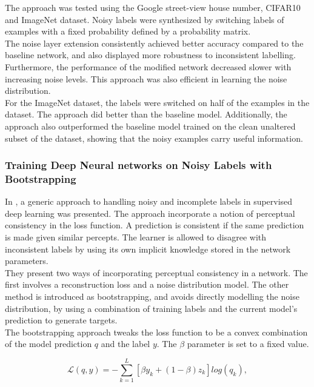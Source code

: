 The approach was tested using the Google street-view house number, CIFAR10 and ImageNet dataset. Noisy labels were synthesized by switching labels of examples with a fixed probability defined by a probability matrix. \\

The noise layer extension consistently achieved better accuracy compared to the baseline network, and also displayed more robustness to inconsistent labelling. Furthermore, the performance of the modified network decreased slower with increasing noise levels. This approach was also efficient in learning the noise distribution. \\

For the ImageNet dataset, the labels were switched on half of the examples in the dataset. The approach did better than the baseline model. Additionally, the approach also outperformed the baseline model trained on the clean unaltered subset of the dataset, showing that the noisy examples carry useful information.


\subsubsection{Training Deep Neural networks on Noisy Labels with Bootstrapping}
In \cite{Reed_noisy_labels_bootstrapping}, a generic approach to handling noisy and incomplete labels in supervised deep learning was presented. The approach incorporate a notion of perceptual consistency in the loss function. A prediction is consistent if the same prediction is made given similar percepts. The learner is allowed to disagree with inconsistent labels by using its own implicit knowledge stored in the network parameters.\\ 

They present two ways of incorporating perceptual consistency in a network. The first involves a reconstruction loss and a noise distribution model. The other method is introduced as bootstrapping, and avoids directly modelling the noise distribution, by using a combination of training labels and the current model's prediction to generate targets.\\

The bootstrapping approach tweaks the loss function to be a convex combination of the model prediction $q$ and the label $y$. The $\beta$ parameter is set to a fixed value.

$$\mathcal{L}(q,y) = - \sum\limits_{k=1}^L [\beta y_k + (1-\beta)z_k]log(q_k),$$

